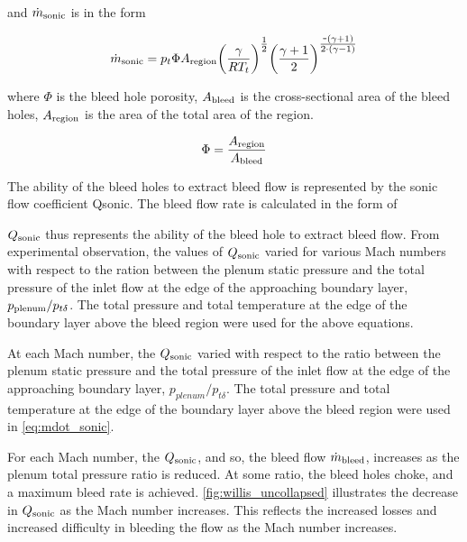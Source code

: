 and $\dot{m}_{\textrm{sonic}}$ is in the form


\begin{equation} \dot{m}_{\textrm{sonic}} = p_t \Phi A_{\textrm{region}} \qty(\frac{\gamma}{RT_t})^{\textstyle\frac{1}{2}} \qty(\frac{\gamma+1}{2})^{\textstyle\frac{\texttt{-}\qty(\gamma+1)}{2\cdot\qty(\gamma-1)}} 
\label{eq:mdot_sonic}
\end{equation}

where $\Phi$ is the bleed hole porosity, $A_{\textrm{bleed}}$ is the cross-sectional area of the bleed holes, $A_{\textrm{region}}$ is the area of the total area of the region.

$$ \Phi = \frac{A_{\textrm{region}}}{A_{\textrm{bleed}}} $$



The ability of the bleed holes to extract bleed flow is represented by the sonic flow coefficient Qsonic. The bleed flow rate is calculated in the form of

$Q_{\textrm{sonic}}$ thus represents the ability of the bleed hole to extract bleed flow. From experimental observation, %
the values of $Q_{\textrm{sonic}}$ varied for various Mach numbers with respect to the ration between the plenum static pressure and the total pressure of the inlet flow at the edge of the approaching boundary layer, $p_{\textrm{plenum}}/p_{t\delta}$. The total pressure and total temperature at the edge of the boundary layer above the bleed region were used for the above equations.

At each Mach number, the $Q_{\textrm{sonic}}$ varied with respect to the ratio between the plenum static pressure and the total pressure of the inlet flow at the edge of the approaching boundary layer, $p_{plenum}/p_{t\delta}$. The total pressure and total temperature at the edge of the boundary layer above the bleed region were used in \cref{eq:mdot_sonic}.

For each Mach number, the $Q_{\textrm{sonic}}$, and so, the bleed flow $\dot{m}_{\textrm{bleed}}$, increases as the plenum total pressure ratio is reduced. At some ratio, the bleed holes choke, and a maximum bleed rate is achieved. \cref{fig:willis_uncollapsed} illustrates the decrease in $Q_{\textrm{sonic}}$ as the Mach number increases. This reflects the increased losses and increased difficulty in bleeding the flow as the Mach number increases.

